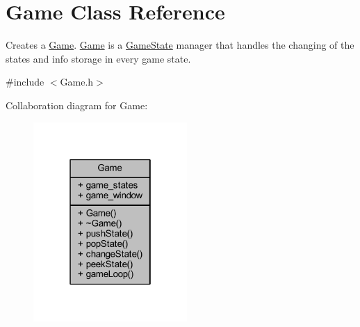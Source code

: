 \hypertarget{class_game}{\section{Game Class Reference}
\label{class_game}
}


Creates a \hyperlink{class_game}{Game}. \hyperlink{class_game}{Game} is a \hyperlink{class_game_state}{Game\+State} manager that handles the changing of the states and info storage in every game state.  




{\ttfamily \#include $<$Game.\+h$>$}



Collaboration diagram for Game\+:
\nopagebreak
\begin{figure}[H]
\begin{center}
\leavevmode
\includegraphics[width=166pt]{class_game__coll__graph}
\end{center}
\end{figure}
